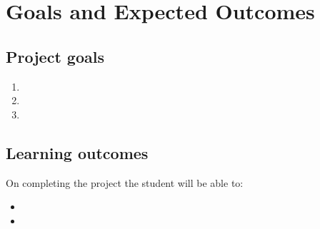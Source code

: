 \chapter{Goals and Expected Outcomes}
\label{ch:goals}

\section{Project goals}
\begin{enumerate}
  \item {}
  \item {}
  \item {}
\end{enumerate}

\section{Learning outcomes}
On completing the project the student will be able to:
\begin{itemize}
  \item {}
  \item {}
\end{itemize}
